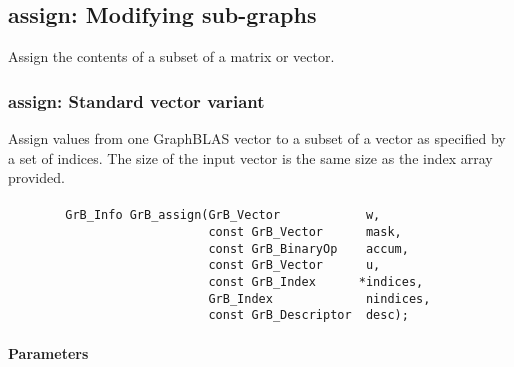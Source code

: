 \subsection{{\sf assign}: Modifying sub-graphs}
\label{Sec:assign}

Assign the contents of a subset of a matrix or vector.


\subsubsection{{\sf assign}: Standard vector variant}

Assign values from one GraphBLAS vector to a subset of a 
vector as specified by a set of indices. The size of the input vector is the
same size as the index array provided.

\paragraph{\syntax}

\begin{verbatim}
        GrB_Info GrB_assign(GrB_Vector            w,
                            const GrB_Vector      mask,
                            const GrB_BinaryOp    accum,
                            const GrB_Vector      u,
                            const GrB_Index      *indices,
                            GrB_Index             nindices,
                            const GrB_Descriptor  desc);
\end{verbatim}

\paragraph{Parameters}

